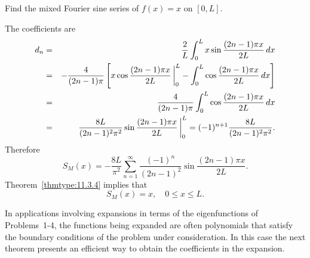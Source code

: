 \begin{example}
  \label{example:11.3.4} \rm Find the mixed Fourier sine series of $f(x)=x$ on $[0,L]$.
\end{example}

\begin{examplesolution}
\solution The coefficients are
\begin{eqnarray*}
  d_{n} & = & \frac{2}{L}\int_{0}^{L}x\sin\frac{(2n-1)\pi x}{2L}\,dx                                                         \\
        & = & -\frac{4}{(2n-1)\pi}\left[x\cos\frac{(2n-1)\pi x}{2L}\,\bigg|_{0}^{L}-\int_{0}^{L}\cos\frac{(2n-1)\pi x}{2L}\,dx\right] \\
        & = & \frac{4}{(2n-1)\pi}\int_{0}^{L}\cos\frac{(2n-1)\pi x}{2L}\,dx                                                  \\
        & = & \frac{8L}{(2n-1)^{2}\pi^{2}}\sin\frac{(2n-1)\pi x}{2L}\,\bigg|_{0}^{L}=(-1)^{n+1}\frac{8L}{(2n-1)^{2}\pi^{2}}.
\end{eqnarray*}
Therefore
\[
  S_{M}(x)=-\frac{8L}{\pi^{2}}\sum_{n=1}^{\infty}\frac{(-1)^{n}}{(2n-1)^{2}}\sin\frac{(2n-1)\pi x}{2L}.
\]
Theorem~\ref{thmtype:11.3.4} implies that
\[
  S_{M}(x)=x,\quad0\le x\le L.
\]
\end{examplesolution}


\noindent
In applications involving expansions in terms of the eigenfunctions of Problems~1-4, the functions
being expanded are often polynomials that satisfy the boundary conditions of the problem under
consideration. In this case the next theorem presents an efficient way to obtain the coefficients in
the expansion.

